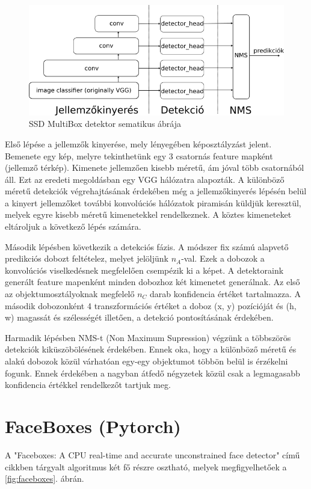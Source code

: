\begin{figure}
    \centering
    \includegraphics[width=\linewidth]{figures/ssd_multibox_detector.png}
    \caption{SSD MultiBox detektor sematikus ábrája}
    \label{fig:ssd_multibox_detector}
\end{figure}

Első lépése a jellemzők kinyerése, mely lényegében képosztályzást jelent. Bemenete egy kép, melyre tekinthetünk egy 3 csatornás feature mapként (jellemző térkép). Kimenete jellemzően kisebb méretű, ám jóval több csatornából áll. Ezt az eredeti megoldásban egy VGG\cite{simonyan_very_2015} hálózatra alapozták. A különböző méretű detekciók végrehajtásának érdekében még a jellemzőkinyerés lépésén belül a kinyert jellemzőket további konvolúciós hálózatok piramisán küldjük keresztül, melyek egyre kisebb méretű kimenetekkel rendelkeznek. A köztes kimeneteket eltároljuk a következő lépés számára.

Második lépésben következik a detekciós fázis. A módszer fix számú alapvető predikciós dobozt feltételez, melyet jelöljünk \(n_A\)-val. Ezek a dobozok a konvolúciós viselkedésnek megfelelően csempézik ki a képet. A detektoraink generált feature mapenként minden dobozhoz két kimenetet generálnak. Az első az objektumosztályoknak megfelelő \(n_C\) darab konfidencia értéket tartalmazza. A második dobozonként 4 transzformációs értéket a doboz (x, y) pozícióját és (h, w) magassát és szélességét illetően, a detekció pontosításának érdekében.

Harmadik lépésben NMS-t (Non Maximum Supression) végzünk a többszörös detekciók kiküszöbölésének érdekében. Ennek oka, hogy a különböző méretű és alakú dobozok közül várhatóan egy-egy objektumot többön belül is érzékelni fogunk. Ennek érdekében a nagyban átfedő négyzetek közül csak a legmagasabb konfidencia értékkel rendelkezőt tartjuk meg.

\section{FaceBoxes (Pytorch)}
A "Faceboxes: A CPU real-time and accurate unconstrained face detector" című cikkben tárgyalt algoritmus két fő részre osztható, melyek megfigyelhetőek a
\ref{fig:faceboxes}. ábrán.

